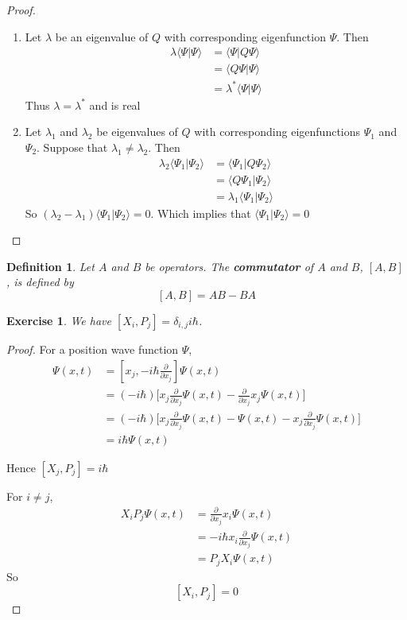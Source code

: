 \documentclass[12pt]{amsart}
\newtheorem{defn}[thm]{Definition}
\newtheorem{ex}[thm]{Exercise}
\renewcommand{\r}{\rangle}
\renewcommand{\l}{\langle}
\newcommand{\del}{\delta}
\newcommand{\lam}{\lambda}
\newcommand{\p}[1]{\frac{\partial}{\partial{#1}}}
\begin{document}
\begin{proof}
\ \begin{enumerate}
\item Let $\lam$ be an eigenvalue of $Q$ with corresponding eigenfunction $\Psi$. Then 
\begin{align*}
 \lam \l \Psi \vert \Psi\r
&= \l \Psi \vert Q \Psi\r \\
&= \l Q \Psi \vert \Psi\r \\
&= \lam^* \l \Psi \vert \Psi\r
\end{align*}
Thus $\lam = \lam^*$ and is real

\item Let $\lam_1$ and $\lam_2$ be eigenvalues of $Q$ with corresponding eigenfunctions $\Psi_1$ and $\Psi_2$. Suppose that $\lam_1 \neq \lam_2$. Then 
\begin{align*}
\lam_2 \l \Psi_1 \vert  \Psi_2\r
&= \l \Psi_1 \vert Q \Psi_2\r\\
&= \l Q \Psi_1 \vert  \Psi_2\r\\
&= \lam_1 \l \Psi_1 \vert  \Psi_2\r
\end{align*}
So $(\lam_2 - \lam_1)\l \Psi_1 \vert  \Psi_2\r = 0$. Which implies that $\l \Psi_1 \vert  \Psi_2\r=0$
\end{enumerate}
\end{proof}

\begin{defn}
Let $A$ and $B$ be operators. The \textbf{commutator} of $A$ and $B$, $[A,B]$, is defined by $$[A,B] = AB - BA$$
\end{defn}

\begin{ex}
We have $[X_i, P_j] = \del_{i,j}i\hbar$.
\end{ex}

\begin{proof}
For a position wave function $\Psi$, 
\begin{align*}
[X_j, P_j]\Psi(x,t)
&= [x_j, -i\hbar \p{x_j}]\Psi(x,t)\\
&= (-i\hbar) \bigg[x_j \p{x_j}\Psi(x,t)- \p{x_j}x_j\Psi(x,t)\bigg]\\
&= (-i\hbar)\bigg[ x_j \p{x_j}\Psi(x,t)- \Psi(x,t) - x_j \p{x_j}\Psi(x,t)\bigg]\\
&=i\hbar \Psi(x,t)
\end{align*}

Hence $[X_j, P_j] = i\hbar$\vspace{.5cm}

For $i\neq j$, 
\begin{align*}
X_iP_j \Psi(x,t)
&= \p{x_j}x_i \Psi(x,t)\\
& = -i \hbar x_i \p{x_j}\Psi(x,t) \\
&= P_jX_i \Psi(x,t)
\end{align*}
So $$[X_i,P_j] =0 $$
\end{proof}
\end{document}
